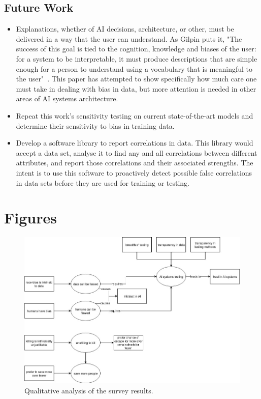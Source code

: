 \documentclass[]{report}
\begin{document}
\FloatBarrier
\section{Future Work}

\begin{itemize}
    \item Explanations, whether of AI decisions, architecture, or other, must be delivered in a way
    that the user can understand. As Gilpin puts it, "The success of this goal is tied to the
    cognition, knowledge and biases of the user: for a system to be interpretable, it must produce
    descriptions that are simple enough for a person to understand using a vocabulary that is
    meaningful to the user"~\cite{gilpin2018explaining}. This paper has attempted to show
    specifically how much care one must take in dealing with bias in data, but more attention is
    needed in other areas of AI systems architecture.

    \item Repeat this work's sensitivity testing on current state-of-the-art models and determine
    their sensitivity to bias in training data.

    \item Develop a software library to report correlations in data. This library would accept a
    data set, analyse it to find any and all correlations between different attributes, and report
    those correlations and their associated strengths. The intent is to use this software to
    proactively detect possible false correlations in data sets before they are used for training or
    testing.
\end{itemize}




\appendix
\chapter{Figures}

\begin{figure}[h]
    \centering
    \includegraphics[scale=0.46]{figures/moral_ai_survey_analysis.jpg}
    \caption[]{Qualitative analysis of the survey results.}
    \label{fig:survey_analysis}
\end{figure}
\end{document}
